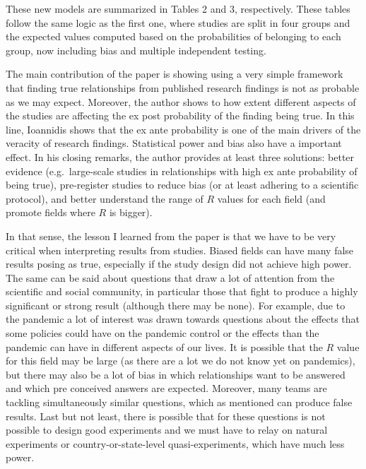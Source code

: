 \documentclass[11pt, english]{article}
\begin{document}
These new models are summarized in Tables 2 and 3, respectively. These
tables follow the same logic as the first one, where studies are split
in four groups and the expected values computed based on the
probabilities of belonging to each group, now including bias and multiple
independent testing.

The main contribution of the paper is showing using a very simple
framework that finding true relationships from published research
findings is not as probable as we may expect. Moreover, the author shows
to how extent different aspects of the studies are affecting the ex post
probability of the finding being true. In this line, Ioannidis shows
that the ex ante probability is one of the main drivers of the veracity
of research findings. Statistical power and bias also have a important
effect. In his closing remarks, the author provides at least three
solutions: better evidence (e.g.~large-scale studies in relationships
with high ex ante probability of being true), pre-register studies to
reduce bias (or at least adhering to a scientific protocol), and better
understand the range of \(R\) values for each field (and promote fields
where \(R\) is bigger).

In that sense, the lesson I learned from the paper is that we have to be
very critical when interpreting results from studies. Biased fields can
have many false results posing as true, especially if the study design
did not achieve high power. The same can be said about questions that
draw a lot of attention from the scientific and social community, in
particular those that fight to produce a highly significant or strong
result (although there may be none). For example, due to the pandemic a
lot of interest was drawn towards questions about the effects that some
policies could have on the pandemic control or the effects than the
pandemic can have in different aspects of our lives. It is possible that
the \(R\) value for this field may be large (as there are a lot we do
not know yet on pandemics), but there may also be a lot of bias in which
relationships want to be answered and which pre conceived answers are
expected. Moreover, many teams are tackling simultaneously similar
questions, which as mentioned can produce false results. Last but not
least, there is possible that for these questions is not possible to
design good experiments and we must have to relay on natural experiments
or country-or-state-level quasi-experiments, which have much less
power.\\
    
\end{document}
